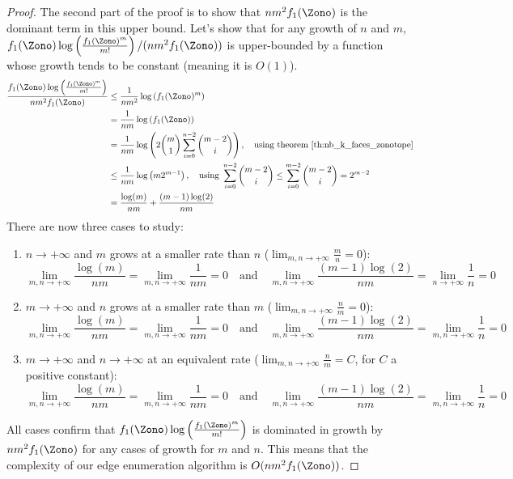 \begin{proof}
    The second part of the proof is to show that $nm^2f_1(\Zono)$ is the dominant term in this upper bound. Let's show that for any growth of $n$ and $m$, $f_1(\Zono)\log\left(\frac{f_1(\Zono)^m}{m!}\right) / (nm^2f_1(\Zono))$ is upper-bounded by a function whose growth tends to be constant (meaning it is $O(1)$).
    \begin{align*}
        \frac{f_1(\Zono)\log\left(\frac{f_1(\Zono)^m}{m!}\right)}{nm^2f_1(\Zono)} 
        &\leq \frac{1}{nm^2}\log\left(f_1(\Zono)^m\right) \\
        &= \frac{1}{nm}\log\left(f_1(\Zono)\right) \\
        &= \frac{1}{nm} \log\left(2\binom{m}{1}\sum_{i=0}^{n-2}\binom{m-2}{i}\right),\quad \text{using theorem \ref{th:nb_k_faces_zonotope}} \\
        &\leq \frac{1}{nm} \log\left(m2^{m-1}\right),\quad \text{using } \sum_{i=0}^{n-2}\binom{m-2}{i} \leq \sum_{i=0}^{m-2}\binom{m-2}{i} = 2^{m-2}  \\
        &= \frac{ \log(m)}{nm} + \frac{ (m-1)\log(2)}{nm} \\
    \end{align*}
    There are now three cases to study:
    \begin{enumerate}[noitemsep]
        \item {$n \rightarrow +\infty$ and $m$ grows at a smaller rate than $n$ ($\lim_{m,n\to +\infty}\frac{m}{n} = 0$): 
        $$\lim_{m,n\to +\infty}\frac{ \log(m)}{nm} = \lim_{m,n\to +\infty}\frac{1}{nm}  = 0\quad \text{and} \quad \lim_{m,n\to +\infty} \frac{ (m-1)\log(2)}{nm} = \lim_{n\to +\infty}\frac{1}{n}  =  0$$
        }
        \item  {$m \rightarrow +\infty$ and $n$ grows at a smaller rate than $m$ ($\lim_{m,n\to +\infty}\frac{n}{m} = 0$): 
        $$\lim_{m,n\to +\infty}\frac{ \log(m)}{nm} = \lim_{m,n\to +\infty}\frac{1}{nm}  = 0\quad \text{and} \quad \lim_{m,n\to +\infty} \frac{ (m-1)\log(2)}{nm} = \lim_{m,n\to +\infty}\frac{1}{n}  =  0$$
         }
         \item  {$m \rightarrow +\infty$ and $n \rightarrow +\infty$ at an equivalent rate ($\lim_{m,n\to +\infty}\frac{n}{m} = C$, for $C$ a positive constant): 
         $$\lim_{m,n\to +\infty}\frac{ \log(m)}{nm} = \lim_{m,n\to +\infty}\frac{1}{nm}  = 0\quad \text{and} \quad \lim_{m,n\to +\infty} \frac{ (m-1)\log(2)}{nm} = \lim_{m,n\to +\infty}\frac{1}{n}  =  0$$
          }
    \end{enumerate}
    All cases confirm that $f_1(\Zono)\log\left(\frac{f_1(\Zono)^m}{m!}\right)$ is dominated in growth by $nm^2f_1(\Zono)$ for any cases of growth for $m$ and $n$. This means that the complexity of our edge enumeration algorithm is $O(nm^2f_1(\Zono))$.
\end{proof}

